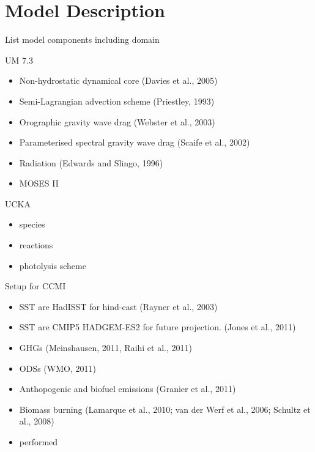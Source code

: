 \section{Model Description}

List model components including domain

UM 7.3
\begin{itemize}
\item Non-hydrostatic dynamical core (Davies et al., 2005)
\item Semi-Lagrangian advection scheme (Priestley, 1993)
\item Orographic gravity wave drag (Webster et al., 2003)
\item Parameterised spectral gravity wave drag (Scaife et al., 2002)
\item Radiation (Edwards and Slingo, 1996)
\item MOSES II
\end{itemize}
UCKA
\begin{itemize}
\item species
\item reactions
\item photolysis scheme
\end{itemize}
Setup for CCMI
\begin{itemize}
\item SST are HadISST for hind-cast (Rayner et al., 2003)
\item SST are CMIP5 HADGEM-ES2 for future projection. (Jones et al., 2011)
\item GHGs (Meinshausen, 2011, Raihi et al., 2011)
\item ODSs (WMO, 2011)
\item Anthopogenic and biofuel emissions (Granier et al., 2011)
\item Biomass burning (Lamarque et al., 2010; van der Werf et al., 2006; Schultz et al., 2008)
\item performed
\end{itemize}



